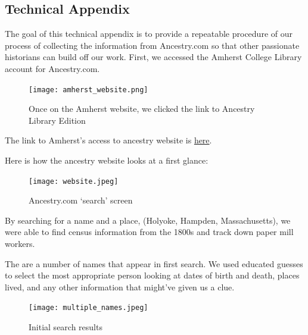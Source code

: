 \documentclass[
  letterpaper,
  DIV=11,
  numbers=noendperiod]{scrartcl}
\begin{document}
\clearpage

\hypertarget{technical-appendix}{%
\subsection{\texorpdfstring{\textbf{Technical
Appendix}}{Technical Appendix}}\label{technical-appendix}}

The goal of this technical appendix is to provide a repeatable procedure
of our process of collecting the information from Ancestry.com so that
other passionate historians can build off our work. First, we accessed
the Amherst College Library account for Ancestry.com.

\begin{figure}

{\centering \texttt{[image: amherst\_website.png]}

}

\caption{\label{fig-sample9}Once on the Amherst website, we clicked the
link to Ancestry Library Edition}

\end{figure}

The link to Amherst's access to ancestry website is
\href{https://libguides.amherst.edu/c.php?g=944984\&p=6812570}{here}.

Here is how the ancestry website looks at a first glance:

\begin{figure}

{\centering \texttt{[image: website.jpeg]}

}

\caption{\label{fig-sample10}Ancestry.com `search' screen}

\end{figure}

By searching for a name and a place, (Holyoke, Hampden, Massachusetts),
we were able to find census information from the 1800s and track down
paper mill workers.

The are a number of names that appear in first search. We used educated
guesses to select the most appropriate person looking at dates of birth
and death, places lived, and any other information that might've given
us a clue.

\begin{figure}

{\centering \texttt{[image: multiple\_names.jpeg]}

}

\caption{\label{fig-sample11}Initial search results}

\end{figure}
\end{document}

